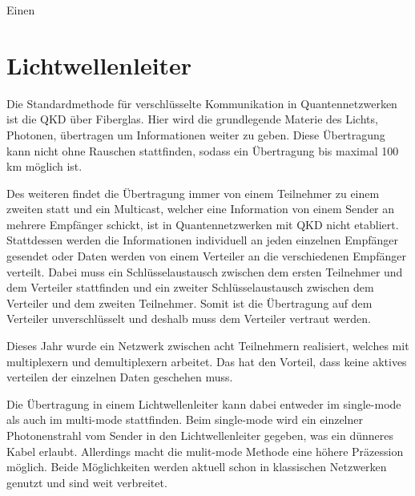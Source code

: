Einen

\section{Lichtwellenleiter}

Die Standardmethode für verschlüsselte Kommunikation in Quantennetzwerken ist die \ac{QKD} über Fiberglas.
Hier wird die grundlegende Materie des Lichts, Photonen, übertragen um Informationen weiter zu geben.
Diese Übertragung kann nicht ohne Rauschen stattfinden, sodass ein Übertragung bis maximal 100 km möglich ist\cite{Shen2018}.

Des weiteren findet die Übertragung immer von einem Teilnehmer zu einem zweiten statt und ein Multicast, welcher eine Information von einem Sender an mehrere Empfänger schickt, ist in Quantennetzwerken mit \ac{QKD} nicht etabliert.
Stattdessen werden die Informationen individuell an jeden einzelnen Empfänger gesendet oder Daten werden von einem Verteiler an die verschiedenen Empfänger verteilt.
Dabei muss ein Schlüsselaustausch zwischen dem ersten Teilnehmer und dem Verteiler stattfinden und ein zweiter Schlüsselaustausch zwischen dem Verteiler und dem zweiten Teilnehmer.
Somit ist die Übertragung auf dem Verteiler unverschlüsselt und deshalb muss dem Verteiler vertraut werden\cite{Qiu2018}.

Dieses Jahr wurde ein Netzwerk zwischen acht Teilnehmern realisiert, welches mit multiplexern und demultiplexern arbeitet.
Das hat den Vorteil, dass keine aktives verteilen der einzelnen Daten geschehen muss\cite{Siddarth2020}.

Die Übertragung in einem Lichtwellenleiter kann dabei entweder im single-mode als auch im multi-mode stattfinden.
Beim single-mode wird ein einzelner Photonenstrahl vom Sender in den Lichtwellenleiter gegeben, was ein dünneres Kabel erlaubt.
Allerdings macht die mulit-mode Methode eine höhere Präzession möglich\cite{VanMeter2014}.
Beide Möglichkeiten werden aktuell schon in klassischen Netzwerken genutzt und sind weit verbreitet.

